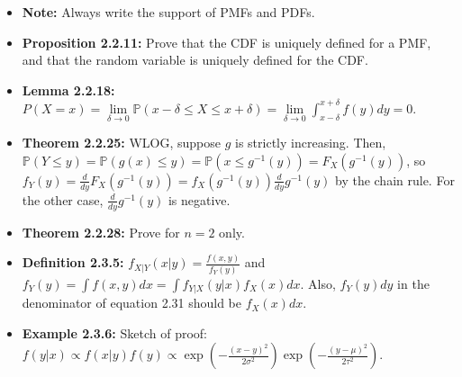 \documentclass[12pt]{article}
\newcommand{\p}{\mathbb{P}}
\begin{document}
\begin{itemize}
    \item \textbf{Note:} Always write the support of PMFs and PDFs.
    \item \textbf{Proposition 2.2.11:} Prove that the CDF is uniquely defined for a PMF, and that the random variable is uniquely defined for the CDF.
    \item \textbf{Lemma 2.2.18:} $P(X = x) = \lim \limits_{\delta \to 0} \p(x - \delta \leq X \leq x + \delta) = \lim \limits_{\delta \to 0} \int_{x - \delta}^{x + \delta} f(y)dy = 0$.
    \item \textbf{Theorem 2.2.25:} WLOG, suppose $g$ is strictly increasing. Then, $\p(Y \leq y) = \p(g(x) \leq y) = \p(x \leq g^{-1}(y)) = F_X(g^{-1}(y))$, so $f_Y(y) = \frac{d}{dy} F_X(g^{-1}(y)) = f_X(g^{-1}(y)) \frac{d}{dy} g^{-1}(y)$ by the chain rule. For the other case, $\frac{d}{dy} g^{-1}(y)$ is negative.
    \item \textbf{Theorem 2.2.28:} Prove for $n = 2$ only.
    \item \textbf{Definition 2.3.5:} $f_{X|Y}(x|y) = \frac{f(x,y)}{f_Y(y)}$ and $f_Y(y) = \int f(x,y)dx = \int f_{Y|X}(y|x)f_X(x)dx$. Also, $f_Y(y)dy$ in the denominator of equation 2.31 should be $f_X(x)dx$.
    \item \textbf{Example 2.3.6:} Sketch of proof: $f(y|x) \propto f(x|y)f(y) \propto \exp(-\frac{(x - y)^2}{2\sigma^2}) \exp(-\frac{(y - \mu)^2}{2\tau^2})$.
\end{itemize}
\end{document}
